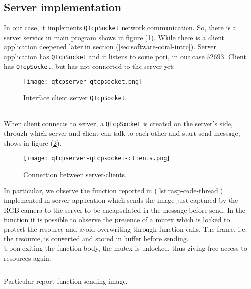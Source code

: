 \subsection{Server implementation}
\label{ssec:soft-rasp-server}
In our case, it implements \texttt{QTcpSocket} network communication.  So, there
is a server service in main program shows in figure
(\ref{fig:software-socket-server}). While there is a client application deepened
later in section (\ref{sec:software-coral-intro}). Server application has
\texttt{QTcpSocket} and it listens to some port, in our case $52693$.
 Client has \texttt{QTcpSocket}, but has not connected to the server yet:\linebreak
%
%
\begin{figure}[!ht]
	\centering
	\texttt{[image: qtcpserver-qtcpsocket.png]}
	\caption{Interface client server \texttt{QTcpSocket}.}
	\label{fig:software-socket-server}
\end{figure}
%
\\When client connects to server, a \texttt{QTcpSocket} is created on the server’s
side, through which server and client can talk to each other and start send
message, shows in figure (\ref{fig:software-socket-server-client}).
%
%
\begin{figure}[htb]
	\centering
	\texttt{[image: qtcpserver-qtcpsocket-clients.png]}
	\caption{Connection between server-clients.}
	\label{fig:software-socket-server-client}
\end{figure}
%
In particular, we observe the function reported in (\ref{lst:rasp-code-thread})
implemented in server application which sends the image just captured by the RGB
camera to the server to be  encapsulated in the message before send. 
In the function it is possible to observe the presence of a mutex which is 
locked to protect the resource and avoid overwriting through function calls.
The frame, i.e. the resource, is converted and stored in buffer before
sending.\\ 
Upon exiting the function body, the mutex is unlocked, thus giving free
access to resources again.
\begin{listing}[ht]
\inputminted[frame=lines,framesep=2mm, linenos=true, autogobble, breaklines=true, fontsize=\scriptsize, firstline=84, lastline=95]{c++}{software/code/mainwindow.cpp} 
\caption{Particular report function sending image.} 
\label{lst:rasp-code-thread} 
\end{listing}
